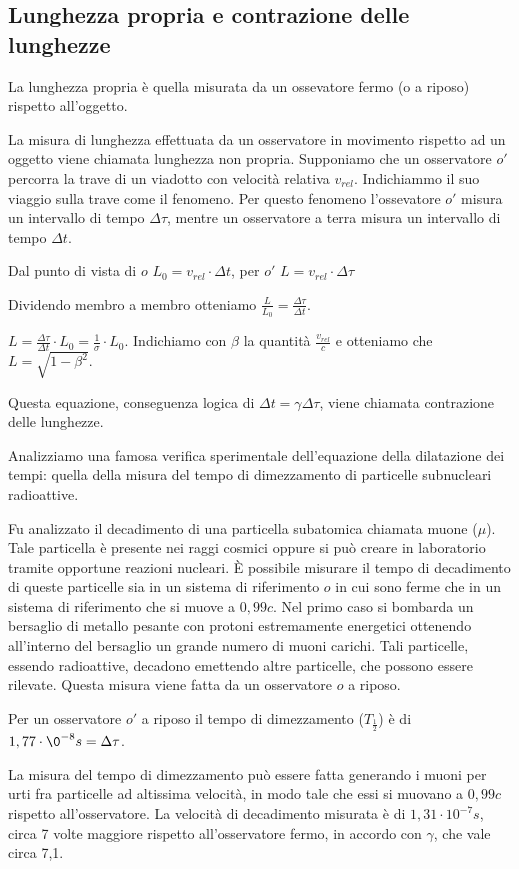     \subsection{Lunghezza propria e contrazione delle lunghezze}
	\par La lunghezza propria è quella misurata da un ossevatore fermo (o a riposo) rispetto all'oggetto.
	\par La misura di lunghezza effettuata da un osservatore in movimento rispetto ad un oggetto viene chiamata lunghezza non propria.
	Supponiamo che un osservatore $o'$ percorra la trave di un viadotto con velocità relativa $v_{rel}$. Indichiammo il suo viaggio sulla trave
	come il fenomeno. Per questo fenomeno l'ossevatore $o'$ misura un intervallo di tempo $\Delta\tau$, mentre un osservatore a terra misura
	un intervallo di tempo $\Delta t$.
	\par Dal punto di vista di $o$ $L_0=v_{rel}\cdot\Delta t$, per $o'$ $L=v_{rel}\cdot\Delta\tau$
	\par Dividendo membro a membro otteniamo $\frac{L}{L_0} = \frac{\Delta\tau}{\Delta t}$.
	\par $L=\frac{\Delta\tau}{\Delta t}\cdot L_0 = \frac{1}{\sigma}\cdot L_0$. Indichiamo con $\beta$ la quantità $\frac{v_{rel}}{c}$ e otteniamo
	che $L=\sqrt{1-\beta^2}$.
	\par Questa equazione, conseguenza logica di $\Delta t = \gamma\Delta\tau$, viene chiamata contrazione delle lunghezze.
	\par Analizziamo una famosa verifica sperimentale dell'equazione della dilatazione dei tempi: quella della misura del tempo di dimezzamento
	di particelle subnucleari radioattive.
	\par Fu analizzato il decadimento di una particella subatomica chiamata muone ($\mu$). Tale particella è presente nei raggi cosmici oppure si
	può creare in laboratorio tramite opportune reazioni nucleari. È possibile misurare il tempo di decadimento di queste particelle sia in un 
	sistema di riferimento $o$ in cui sono ferme che in un sistema di riferimento che si muove a $0,99c$. Nel primo caso si bombarda un bersaglio di
	metallo pesante con protoni estremamente energetici ottenendo all'interno del bersaglio un grande numero di muoni carichi. Tali particelle,
	essendo radioattive, decadono emettendo altre particelle, che possono essere rilevate. Questa misura viene fatta da un osservatore $o$ a riposo.
	\par Per un osservatore $o'$ a riposo il tempo di dimezzamento ($T_\frac{1}{2}$) è di $1,77\cdot\0^{-8}s=\Delta\tau$.
	\par La misura del tempo di dimezzamento può essere fatta generando i muoni per urti fra particelle ad altissima velocità, in modo tale che essi si
	muovano a $0,99c$ rispetto all'osservatore. La velocità di decadimento misurata è di $1,31\cdot10^{-7}s$, circa 7 volte maggiore rispetto
	all'osservatore fermo, in accordo con $\gamma$, che vale circa 7,1.
